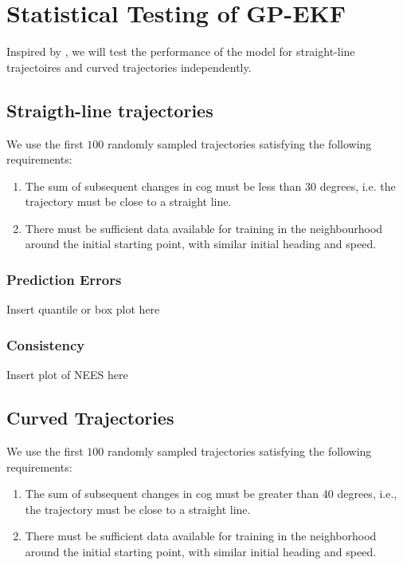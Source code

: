 \chapter{Statistical Testing of GP-EKF}
Inspired by \cite{hexeberg}, we will test the performance of the model for straight-line trajectoires and curved trajectories independently.
\section{Straigth-line trajectories}
We use the first $100$ randomly sampled trajectories satisfying the following requirements:
\begin{enumerate}
    \item The sum of subsequent changes in \acrshort{cog} must be less than $30$ degrees, i.e. the trajectory must be close to a straight line.
    \item There must be sufficient data available for training in the neighbourhood around the initial starting point, with similar initial heading and speed.
\end{enumerate}
\subsection{Prediction Errors}
Insert quantile or box plot here
\subsection{Consistency}
Insert plot of NEES here

\section{Curved Trajectories}
We use the first $100$ randomly sampled trajectories satisfying the following requirements:
\begin{enumerate}
    \item The sum of subsequent changes in \acrshort{cog} must be greater than $40$ degrees, i.e., the trajectory must be close to a straight line.
    \item There must be sufficient data available for training in the neighborhood around the initial starting point, with similar initial heading and speed.
\end{enumerate}

